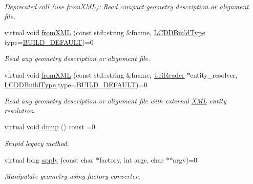 \begin{DoxyCompactItemize}
\begin{DoxyCompactList}\small\item\em Deprecated call (use from\+X\+ML)\+: Read compact geometry description or alignment file. \end{DoxyCompactList}\item 
virtual void \hyperlink{class_d_d4hep_1_1_geometry_1_1_l_c_d_d_ad6e8de7ab4f0374cea7e3e15e33af66e}{from\+X\+ML} (const std\+::string \&fname, \hyperlink{namespace_d_d4hep_acafe43ba4537ab6e999e808142965fab}{L\+C\+D\+D\+Build\+Type} type=\hyperlink{namespace_d_d4hep_acafe43ba4537ab6e999e808142965fabaceac720f961afd2369fcc9f343113a2e}{B\+U\+I\+L\+D\+\_\+\+D\+E\+F\+A\+U\+LT})=0
\begin{DoxyCompactList}\small\item\em Read any geometry description or alignment file. \end{DoxyCompactList}\item 
virtual void \hyperlink{class_d_d4hep_1_1_geometry_1_1_l_c_d_d_aab90efbd334c08ee8a06b0f97d219243}{from\+X\+ML} (const std\+::string \&fname, \hyperlink{class_d_d4hep_1_1_geometry_1_1_l_c_d_d_a69f1e3e4fbcef1d57f1df1c2bd85918f}{Uri\+Reader} $\ast$entity\+\_\+resolver, \hyperlink{namespace_d_d4hep_acafe43ba4537ab6e999e808142965fab}{L\+C\+D\+D\+Build\+Type} type=\hyperlink{namespace_d_d4hep_acafe43ba4537ab6e999e808142965fabaceac720f961afd2369fcc9f343113a2e}{B\+U\+I\+L\+D\+\_\+\+D\+E\+F\+A\+U\+LT})=0
\begin{DoxyCompactList}\small\item\em Read any geometry description or alignment file with external \hyperlink{namespace_d_d4hep_1_1_x_m_l}{X\+ML} entity resolution. \end{DoxyCompactList}\item 
virtual void \hyperlink{class_d_d4hep_1_1_geometry_1_1_l_c_d_d_aa67b3fbf93d48e08c08b60cdd83b729f}{dump} () const =0
\begin{DoxyCompactList}\small\item\em Stupid legacy method. \end{DoxyCompactList}\item 
virtual long \hyperlink{class_d_d4hep_1_1_geometry_1_1_l_c_d_d_ab47f82e5a5bfda6f58624b3553a08c68}{apply} (const char $\ast$factory, int argc, char $\ast$$\ast$argv)=0
\begin{DoxyCompactList}\small\item\em Manipulate geometry using factory converter. \end{DoxyCompactList}\item 
$$
\end{DoxyCompactItemize}
